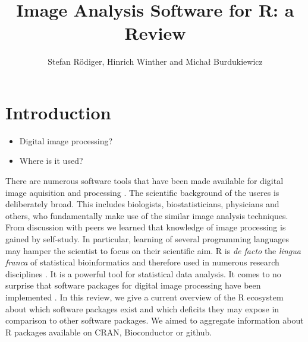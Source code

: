 \title{Image Analysis Software for R: a Review}
\author{Stefan R\"{o}diger, Hinrich Winther and Micha\l{} Burdukiewicz}

\maketitle


\section{Introduction}

\begin{itemize}
\item Digital image processing?
\item Where is it used?
\end{itemize}

There are numerous software tools that have been made available for digital 
image aquisition and processing \citep{wiesmann_review_2015, chieco_image_2013}. 
The scientific background of the useres is deliberately broad. This includes 
biologists, biostatisticians, physicians and others, who fundamentally make use 
of the similar image analysis techniques. From discussion with peers we learned 
that knowledge of image processing is gained by self-study. In particular, 
learning of several programming languages may hamper the scientist to focus on 
their scientific aim. R \citep{R} is \textit{de facto} the \textit{lingua 
franca} of statistical bioinformatics and therefore used in numerous research 
disciplines \citep{rodiger_r_2015}. It is a powerful tool for statistical data 
analysis. It comes to no surprise that software packages for digital image 
processing have been implemented \citep{frery_introduction_2013}. In this 
review, we give a current overview of the R ecosystem about which software 
packages exist and which deficits they may expose in comparison to other 
software packages. We aimed to aggregate information about R packages available 
on CRAN, Bioconductor \citep{gentleman_bioconductor:_2004} or github.

